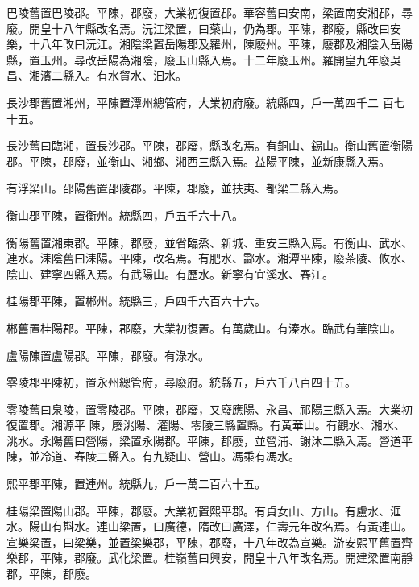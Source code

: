 \begin{pinyinscope}
 巴陵舊置巴陵郡。平陳，郡廢，大業初復置郡。華容舊曰安南，梁置南安湘郡，尋廢。開皇十八年縣改名焉。沅江梁置，曰藥山，仍為郡。平陳，郡廢，縣改曰安樂，十八年改曰沅江。湘陰梁置岳陽郡及羅州，陳廢州。平陳，廢郡及湘陰入岳陽縣，置玉州。尋改岳陽為湘陰，廢玉山縣入焉。十二年廢玉州。羅開皇九年廢吳昌、湘濱二縣入。有水貿水、汩水。



 長沙郡舊置湘州，平陳置潭州總管府，大業初府廢。統縣四，戶一萬四千二
 百七十五。



 長沙舊曰臨湘，置長沙郡。平陳，郡廢，縣改名焉。有銅山、錫山。衡山舊置衡陽郡。平陳，郡廢，並衡山、湘鄉、湘西三縣入焉。益陽平陳，並新康縣入焉。



 有浮梁山。邵陽舊置邵陵郡。平陳，郡廢，並扶夷、都梁二縣入焉。



 衡山郡平陳，置衡州。統縣四，戶五千六十八。



 衡陽舊置湘東郡。平陳，郡廢，並省臨烝、新城、重安三縣入焉。有衡山、武水、連水。洡陰舊曰洡陽。平陳，改名焉。有肥水、酃水。湘潭平陳，廢茶陵、攸水、陰山、建寧四縣入焉。有武陽山。有歷水。新寧有宜溪水、舂江。



 桂陽郡平陳，置郴州。統縣三，戶四千六百六十六。



 郴舊置桂陽郡。平陳，郡廢，大業初復置。有萬歲山。有溱水。臨武有華陰山。



 盧陽陳置盧陽郡。平陳，郡廢。有淥水。



 零陵郡平陳初，置永州總管府，尋廢府。統縣五，戶六千八百四十五。



 零陵舊曰泉陵，置零陵郡。平陳，郡廢，又廢應陽、永昌、祁陽三縣入焉。大業初復置郡。湘源平
 陳，廢洮陽、灌陽、零陵三縣置縣。有黃華山。有觀水、湘水、洮水。永陽舊曰營陽，梁置永陽郡。平陳，郡廢，並營浦、謝沐二縣入焉。營道平陳，並冷道、舂陵二縣入。有九疑山、營山。馮乘有馮水。



 熙平郡平陳，置連州。統縣九，戶一萬二百六十五。



 桂陽梁置陽山郡。平陳，郡廢。大業初置熙平郡。有貞女山、方山。有盧水、洭水。陽山有斟水。連山梁置，曰廣德，隋改曰廣澤，仁壽元年改名焉。有黃連山。宣樂梁置，曰梁樂，並置梁樂郡，平陳，郡廢，十八年改為宣樂。游安熙平舊置齊樂郡，平陳，郡廢。武化梁置。桂嶺舊曰興安，開皇十八年改名焉。開建梁置南靜郡，平陳，郡廢。




\end{pinyinscope}
